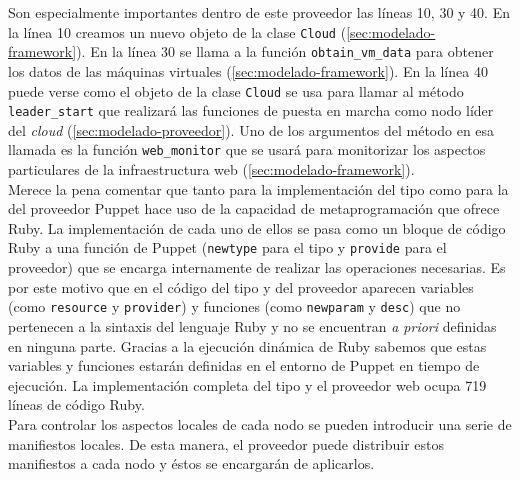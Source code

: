 Son especialmente importantes dentro de este proveedor las líneas 10, 30 y 40. En la línea 10 creamos un nuevo objeto de la clase \texttt{Cloud} (\ref{sec:modelado-framework}). En la línea 30 se llama a la función \texttt{obtain\_vm\_data} para obtener los datos de las máquinas virtuales (\ref{sec:modelado-framework}). En la línea 40 puede verse como el objeto de la clase \texttt{Cloud} se usa para llamar al método \texttt{leader\_start} que realizará las funciones de puesta en marcha como nodo líder del \emph{cloud} (\ref{sec:modelado-proveedor}). Uno de los argumentos del método en esa llamada es la función \texttt{web\_monitor} que se usará para monitorizar los aspectos particulares de la infraestructura web (\ref{sec:modelado-framework}). \\

Merece la pena comentar que tanto para la implementación del tipo como para la del proveedor Puppet hace uso de la capacidad de metaprogramación que ofrece Ruby. La implementación de cada uno de ellos se pasa como un bloque de código Ruby a una función de Puppet (\texttt{newtype} para el tipo y \texttt{provide} para el proveedor) que se encarga internamente de realizar las operaciones necesarias. Es por este motivo que en el código del tipo y del proveedor aparecen variables (como \texttt{resource} y \texttt{provider}) y funciones (como \texttt{newparam} y \texttt{desc}) que no pertenecen a la sintaxis del lenguaje Ruby y no se encuentran \emph{a priori} definidas en ninguna parte. Gracias a la ejecución dinámica de Ruby sabemos que estas variables y funciones estarán definidas en el entorno de Puppet en tiempo de ejecución. La implementación completa del tipo y el proveedor web ocupa 719 líneas de código Ruby. \\

Para controlar los aspectos locales de cada nodo se pueden introducir una serie de manifiestos locales. De esta manera, el proveedor puede distribuir estos manifiestos a cada nodo y éstos se encargarán de aplicarlos.

